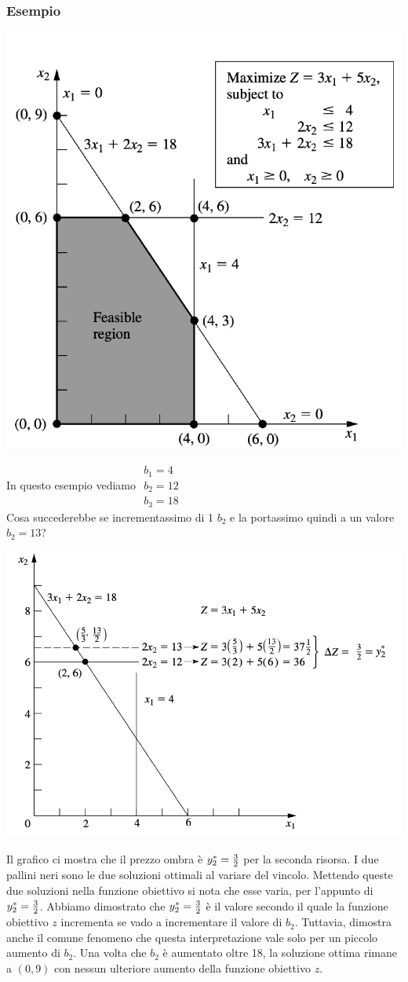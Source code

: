 \documentclass[12pt,a4paper]{article}
\begin{document}
\subsubsection{Esempio}
\begin{center}
\includegraphics[width=0.5\columnwidth]{img/shadow_price_ex.png}
\end{center}
In questo esempio vediamo $\begin{array}{c}b_1=4\\b_2=12\\b_3=18\end{array}$\\
Cosa succederebbe se incrementassimo di 1 $b_2$ e la portassimo quindi a un valore $b_2=13$?
\begin{center}
\includegraphics[width=0.5\columnwidth]{img/shadow_price_exbis.png}
\end{center}
Il grafico ci mostra che il prezzo ombra è $y_2^* = {3\over2}$ per la seconda risorsa. I due pallini neri sono le due soluzioni ottimali al variare del vincolo. Mettendo queste due soluzioni nella funzione obiettivo si nota che esse varia, per l'appunto di $y_2^* = {3\over2}$.
Abbiamo dimostrato che $y_2^* = {3\over2}$ è il valore secondo il quale la funzione obiettivo $z$ incrementa se vado a incrementare il valore di $b_2$. Tuttavia, dimostra anche il comune
fenomeno che questa interpretazione vale solo per un piccolo aumento di $b_2$. Una volta che $b_2$ è aumentato oltre 18, la soluzione ottima rimane a $(0, 9)$ con nessun ulteriore aumento della funzione obiettivo $z$.\\
\end{document}
